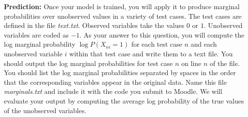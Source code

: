 \documentclass[11pt]{article}
\begin{document}
\begin{problem}{10} \textbf{Prediction:} Once your model is trained, you will apply it to produce marginal probabilities over unobserved values in a variety of test cases. The test cases are defined in the file \textit{text.txt}. Observed variables take the values $0$ or $1$. Unobserved variables are coded as $-1$. As your answer to this question, you will compute the log marginal probability $\log P(X_{ni}=1)$ for each test case $n$ and each unobserved variable $i$ within that test case and write them to a text file. You should output the log marginal probabilities for test case $n$ on line $n$ of the file. You should list the log marginal probabilities separated by spaces in the order that the corresponding variables appear in the original data. Name this file \textit{marginals.txt} and include it with the code you submit to Moodle. We will evaluate your output by computing the average log probability of the true values of the unobserved variables.
\end{problem}

\showpoints
\end{document}
